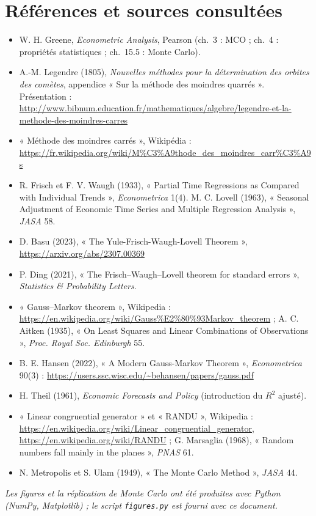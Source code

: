 \documentclass[11pt,a4paper]{article}
\begin{document}
\section*{Références et sources consultées}
\begin{itemize}[leftmargin=*]
\item W. H. Greene, \emph{Econometric Analysis}, Pearson (ch.~3 : MCO ; ch.~4 : propriétés statistiques ; ch.~15.5 : Monte Carlo).
\item A.-M. Legendre (1805), \emph{Nouvelles méthodes pour la détermination des orbites des comètes}, appendice « Sur la méthode des moindres quarrés ». Présentation : \url{http://www.bibnum.education.fr/mathematiques/algebre/legendre-et-la-methode-des-moindres-carres}
\item « Méthode des moindres carrés », Wikipédia : \url{https://fr.wikipedia.org/wiki/M\%C3\%A9thode_des_moindres_carr\%C3\%A9s}
\item R. Frisch et F. V. Waugh (1933), « Partial Time Regressions as Compared with Individual Trends », \emph{Econometrica} 1(4). M. C. Lovell (1963), « Seasonal Adjustment of Economic Time Series and Multiple Regression Analysis », \emph{JASA} 58.
\item D. Basu (2023), « The Yule-Frisch-Waugh-Lovell Theorem », \url{https://arxiv.org/abs/2307.00369}
\item P. Ding (2021), « The Frisch--Waugh--Lovell theorem for standard errors », \emph{Statistics \& Probability Letters}.
\item « Gauss--Markov theorem », Wikipedia : \url{https://en.wikipedia.org/wiki/Gauss\%E2\%80\%93Markov_theorem} ; A. C. Aitken (1935), « On Least Squares and Linear Combinations of Observations », \emph{Proc. Royal Soc. Edinburgh} 55.
\item B. E. Hansen (2022), « A Modern Gauss-Markov Theorem », \emph{Econometrica} 90(3) : \url{https://users.ssc.wisc.edu/~behansen/papers/gauss.pdf}
\item H. Theil (1961), \emph{Economic Forecasts and Policy} (introduction du $R^2$ ajusté).
\item « Linear congruential generator » et « RANDU », Wikipedia : \url{https://en.wikipedia.org/wiki/Linear_congruential_generator}, \url{https://en.wikipedia.org/wiki/RANDU} ; G. Marsaglia (1968), « Random numbers fall mainly in the planes », \emph{PNAS} 61.
\item N. Metropolis et S. Ulam (1949), « The Monte Carlo Method », \emph{JASA} 44.
\end{itemize}
\textit{Les figures et la réplication de Monte Carlo ont été produites avec Python (NumPy, Matplotlib) ; le script \texttt{figures.py} est fourni avec ce document.}
\end{document}
